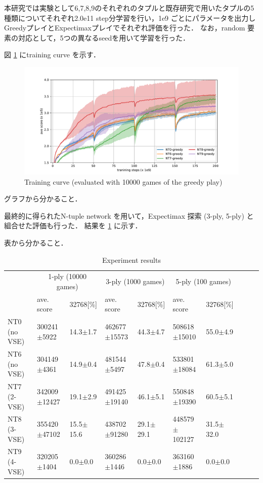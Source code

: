 本研究では実験として6,7,8,9のそれぞれのタプルと既存研究で用いたタプルの5種類についてそれぞれ2.0e11 step分学習を行い，1e9 ごとにパラメータを出力しGreedyプレイとExpectimaxプレイでそれぞれ評価を行った．
なお，random 要素の対応として，5つの異なるseedを用いて学習を行った．

図 \ref{fig:exp2} にtraining curve を示す．

\begin{figure}
 \includegraphics[width=.95\linewidth]{figures/plot-exp2.pdf}
 \caption{Training curve (evaluated with 10000 games of the greedy play)}
 \label{fig:exp2}
\end{figure}

グラフから分かること．


最終的に得られたN-tuple network を用いて，Expectimax 探索 (3-ply, 5-ply) と組合せた評価も行った．
結果を \ref{table:exp3} に示す．

表から分かること．

\begin{table}
 \caption{Experiment results}
 \label{table:exp3}
 \small\begin{tabular}{l|l|l|l|l|l|l|l|l|l}
  \hline \hline
  & \multicolumn{2}{c}{1-ply (10000 games)} & \multicolumn{2}{c}{3-ply (1000 games)} & \multicolumn{2}{c}{5-ply (100 games)} \\
  & ave. score & 32768[\%] & ave. score & 32768[\%] & ave. score & 32768[\%] \\
  \hline
   NT0 (no VSE) & 300241$\pm$\phantom{0}5922	& 14.3$\pm$\phantom{0}1.7		& 462677$\pm$15573		& 44.3$\pm$\phantom{0}4.7		& 508618$\pm$\phantom{0}15010	& 55.0$\pm$\phantom{0}4.9 \\ \hline
   NT6 (no VSE) & 304149$\pm$\phantom{0}4361	& 14.9$\pm$\phantom{0}0.4		& 481544$\pm$\phantom{0}5497	& 47.8$\pm$\phantom{0}0.4	& 533801$\pm$\phantom{0}18084	& 61.3$\pm$\phantom{0}5.0 \\ \hline
   NT7 (2-VSE)	& 342009$\pm$12427		& 19.1$\pm$\phantom{0}2.9		& 491425$\pm$19140		& 46.1$\pm$\phantom{0}5.1		& 550848$\pm$\phantom{0}19390	& 60.5$\pm$\phantom{0}5.1 \\\hline
   NT8 (3-VSE)	& 355420$\pm$47102		& 15.5$\pm$15.6				& 438702$\pm$91280		& 29.1$\pm$29.1		& 448579$\pm$102127	& 31.5$\pm$32.0 \\\hline
   NT9 (4-VSE)	& 320205$\pm$\phantom{0}1404	& \phantom{0}0.0$\pm$\phantom{0}0.0	& 360286$\pm$\phantom{0}1446	& \phantom{0}0.0$\pm$\phantom{0}0.0		& 363160$\pm$\phantom{00}1886	& \phantom{0}0.0$\pm$\phantom{0}0.0 \\\hline
 \end{tabular}
\end{table}

